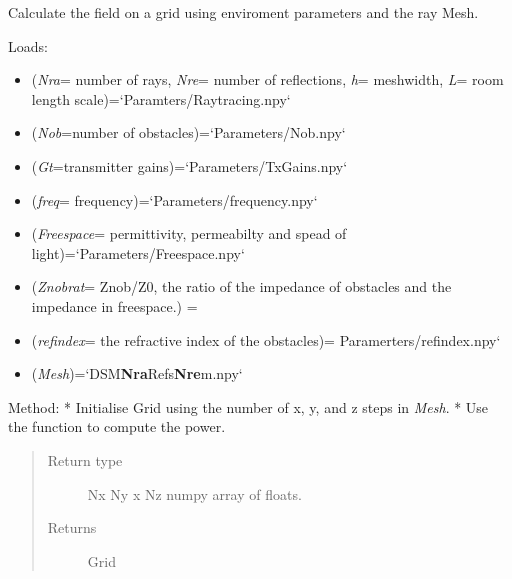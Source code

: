 \documentclass[letterpaper,10pt,english]{sphinxmanual}
\begin{document}
\begin{fulllineitems}
\label{index:RayTracerMainProgram.power_grid}
Calculate the field on a grid using enviroment parameters and the   ray Mesh.

Loads:
\begin{itemize}
\item {} 
(\emph{Nra}= number of rays, \emph{Nre}= number of reflections,   \emph{h}= meshwidth, \emph{L}= room length scale)={}`Paramters/Raytracing.npy{}`

\item {} 
(\emph{Nob}=number of obstacles)={}`Parameters/Nob.npy{}`

\item {} 
(\emph{Gt}=transmitter gains)={}`Parameters/TxGains.npy{}`

\item {} 
(\emph{freq}= frequency)={}`Parameters/frequency.npy{}`

\item {} 
(\emph{Freespace}= permittivity, permeabilty   and spead of light)={}`Parameters/Freespace.npy{}`

\item {} 
(\emph{Znobrat}= Znob/Z0, the ratio of the impedance of obstacles and   the impedance in freespace.) = 

\item {} 
(\emph{refindex}= the refractive index of the obstacles)=  Paramerters/refindex.npy{}`

\item {} 
(\emph{Mesh})={}`DSM\textbf{Nra}Refs\textbf{Nre}m.npy{}`

\end{itemize}

Method:
* Initialise Grid using the number of x, y, and z steps in \emph{Mesh}.
* Use the function 
to compute the power.
\begin{quote}\begin{description}
\item[{Return type}] \leavevmode
Nx Ny x Nz numpy array of floats.

\item[{Returns}] \leavevmode
Grid

\end{description}\end{quote}

\end{fulllineitems}
\end{document}
